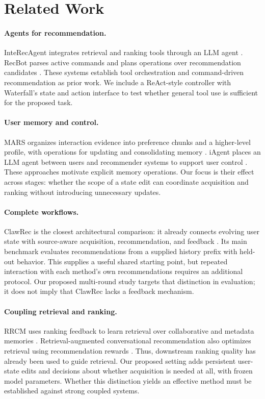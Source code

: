 \documentclass[11pt]{article}
\begin{document}
\section{Related Work}
\label{sec:related}

\paragraph{Agents for recommendation.}
InteRecAgent integrates retrieval and ranking tools through an LLM agent \citep{huang2025interecagent}. RecBot parses active commands and plans operations over recommendation candidates \citep{tang2026recbot}. These systems establish tool orchestration and command-driven recommendation as prior work. We include a ReAct-style controller \citep{yao2023react} with Waterfall's state and action interface to test whether general tool use is sufficient for the proposed task.

\paragraph{User memory and control.}
MARS organizes interaction evidence into preference chunks and a higher-level profile, with operations for updating and consolidating memory \citep{shen2026mars}. iAgent places an LLM agent between users and recommender systems to support user control \citep{xu-etal-2025-iagent}. These approaches motivate explicit memory operations. Our focus is their effect across stages: whether the scope of a state edit can coordinate acquisition and ranking without introducing unnecessary updates.

\paragraph{Complete workflows.}
ClawRec is the closest architectural comparison: it already connects evolving user state with source-aware acquisition, recommendation, and feedback \citep{wu2026clawrec}. Its main benchmark evaluates recommendations from a supplied history prefix with held-out behavior. This supplies a useful shared starting point, but repeated interaction with each method's own recommendations requires an additional protocol. Our proposed multi-round study targets that distinction in evaluation; it does not imply that ClawRec lacks a feedback mechanism.

\paragraph{Coupling retrieval and ranking.}
RRCM uses ranking feedback to learn retrieval over collaborative and metadata memories \citep{li2026rrcm}. Retrieval-augmented conversational recommendation also optimizes retrieval using recommendation rewards \citep{yue2026rar}. Thus, downstream ranking quality has already been used to guide retrieval. Our proposed setting adds persistent user-state edits and decisions about whether acquisition is needed at all, with frozen model parameters. Whether this distinction yields an effective method must be established against strong coupled systems.
\end{document}
